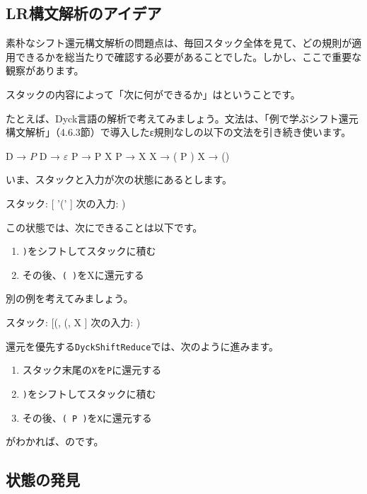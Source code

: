 \subsection{LR構文解析のアイデア}

素朴なシフト還元構文解析の問題点は、毎回スタック全体を見て、どの規則が適用できるかを総当たりで確認する必要があることでした。しかし、ここで重要な観察があります。

スタックの内容によって「次に何ができるか」はということです。

たとえば、Dyck言語の解析で考えてみましょう。文法は、「例で学ぶシフト還元構文解析」（4.6.3節）で導入したε規則なしの以下の文法を引き続き使います。

\begin{codescreen}{}
D → $ P $
D → $ ε $
P → P X
P → X
X → ( P )
X → ()
\end{codescreen}

いま、スタックと入力が次の状態にあるとします。

\begin{codescreen}{}
スタック: [ '(' ]
次の入力: )
\end{codescreen}

この状態では、次にできることは以下です。

\begin{enumerate}
\item
  \texttt{)}をシフトしてスタックに積む
\item
  その後、\texttt{(\ )}をXに還元する
\end{enumerate}

別の例を考えてみましょう。

\begin{codescreen}{}
スタック: [(, (, X  ]
次の入力: )
\end{codescreen}

還元を優先する\texttt{DyckShiftReduce}では、次のように進みます。

\begin{enumerate}
\item
  スタック末尾の\texttt{X}を\texttt{P}に還元する
\item
  \texttt{)}をシフトしてスタックに積む
\item
  その後、\texttt{(\ P\ )}を\texttt{X}に還元する
\end{enumerate}

がわかれば、のです。

\subsection{状態の発見}

